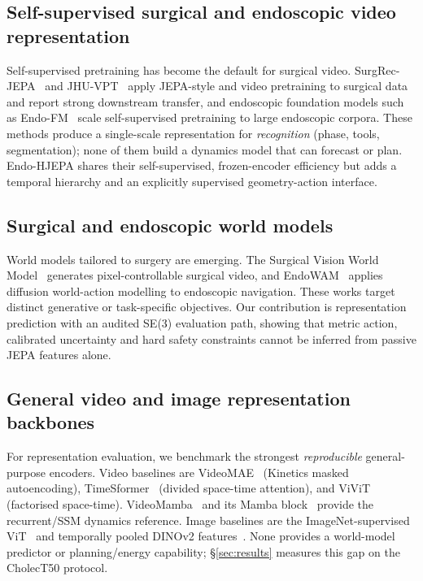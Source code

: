 \documentclass[preprint,12pt]{elsarticle}
\begin{document}
\subsection{Self-supervised surgical and endoscopic video representation}
Self-supervised pretraining has become the default for surgical video. SurgRec-JEPA~\cite{surgrecjepa} and JHU-VPT~\cite{jhuvpt} apply JEPA-style and video pretraining to surgical data and report strong downstream transfer, and endoscopic foundation models such as Endo-FM~\cite{endofoundation} scale self-supervised pretraining to large endoscopic corpora. These methods produce a single-scale representation for \emph{recognition} (phase, tools, segmentation); none of them build a dynamics model that can forecast or plan. Endo-HJEPA shares their self-supervised, frozen-encoder efficiency but adds a temporal hierarchy and an explicitly supervised geometry-action interface.

\subsection{Surgical and endoscopic world models}
World models tailored to surgery are emerging. The Surgical Vision World
Model~\cite{svwm} generates pixel-controllable surgical video, and
EndoWAM~\cite{endowam} applies diffusion world-action modelling to endoscopic
navigation. These works target distinct generative or task-specific
objectives. Our contribution is representation prediction with an audited
SE(3) evaluation path, showing that metric action, calibrated uncertainty and
hard safety constraints cannot be inferred from passive JEPA features alone.

\subsection{General video and image representation backbones}
For representation evaluation, we benchmark the strongest \emph{reproducible}
general-purpose encoders. Video baselines are VideoMAE~\cite{tong2022videomae}
(Kinetics masked autoencoding), TimeSformer~\cite{timesformer} (divided
space-time attention), and ViViT~\cite{vivit} (factorised space-time).
VideoMamba~\cite{videomamba} and its Mamba block~\cite{mamba} provide the
recurrent/SSM dynamics reference. Image baselines are the ImageNet-supervised
ViT~\cite{dosovitskiy2021vit} and temporally pooled DINOv2
features~\cite{dinov2}. None provides a world-model predictor or planning/energy
capability; \S\ref{sec:results} measures this gap on the CholecT50 protocol.
\end{document}

